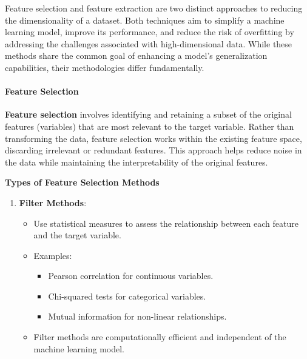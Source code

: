 \documentclass{article}
\providecommand{\tightlist}{%
      \setlength{\itemsep}{0pt}\setlength{\parskip}{0pt}}
\begin{document}
Feature selection and feature extraction are two distinct approaches to
reducing the dimensionality of a dataset. Both techniques aim to
simplify a machine learning model, improve its performance, and reduce
the risk of overfitting by addressing the challenges associated with
high-dimensional data. While these methods share the common goal of
enhancing a model's generalization capabilities, their methodologies
differ fundamentally.

\paragraph{Feature Selection}\label{feature-selection}

\textbf{Feature selection} involves identifying and retaining a subset
of the original features (variables) that are most relevant to the
target variable. Rather than transforming the data, feature selection
works within the existing feature space, discarding irrelevant or
redundant features. This approach helps reduce noise in the data while
maintaining the interpretability of the original features.

\textbf{Types of Feature Selection Methods}

\begin{enumerate}
\def\labelenumi{\arabic{enumi}.}
\tightlist
\item
  \textbf{Filter Methods}:

  \begin{itemize}
  \tightlist
  \item
    Use statistical measures to assess the relationship between each
    feature and the target variable.
  \item
    Examples:

    \begin{itemize}
    \tightlist
    \item
      Pearson correlation for continuous variables.
    \item
      Chi-squared tests for categorical variables.
    \item
      Mutual information for non-linear relationships.
    \end{itemize}
  \item
    Filter methods are computationally efficient and independent of the
    machine learning model.
  \end{itemize}
\end{enumerate}
\end{document}
